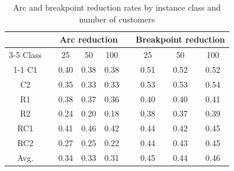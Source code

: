 \begin{table}[H]
\centering
\caption{Arc and breakpoint reduction rates by instance class and number of customers}
\label{Table:preproc}
\setlength{\tabcolsep}{10pt}
\begin{tabular}{ccccccccc}
\hline
& & \multicolumn{3}{c}{Arc reduction} & & \multicolumn{3}{c}{Breakpoint reduction} \\
 \cline{3-5} \cline{7-9}
Class & & 25  & 50  & 100 & & 25  & 50  & 100 \\
\cline{1-1} \cline{3-5} \cline{7-9}
C1 &  & 0.40 & 0.38 & 0.38 &  & 0.51 & 0.52 & 0.52 \\
C2 &  & 0.35 & 0.33 & 0.33 &  & 0.53 & 0.53 & 0.54 \\
R1 &  & 0.38 & 0.37 & 0.36 &  & 0.40 & 0.40 & 0.41 \\
R2 &  & 0.24 & 0.20 & 0.18 &  & 0.38 & 0.37 & 0.39 \\
RC1 &  & 0.41 & 0.46 & 0.42 &  & 0.44 & 0.42 & 0.45 \\
RC2 &  & 0.27 & 0.25 & 0.22 &  & 0.44 & 0.43 & 0.45 \\
\hline
Avg. &  & 0.34 & 0.33 & 0.31 &  & 0.45 & 0.44 & 0.46 \\
\hline
\end{tabular}
\end{table}
